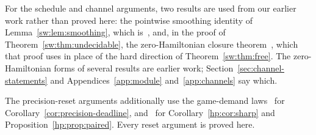 For the schedule and channel arguments, two results are used from our earlier work rather than proved here: the pointwise smoothing identity of Lemma~\ref{sw:lem:smoothing}, which is~\cite[Thm.~4.1 and Cor.~4.3]{Douglas26closed}, and, in the proof of Theorem~\ref{sw:thm:undecidable}, the zero-Hamiltonian closure theorem~\cite[Thm.~3.2(a)]{Memory}, which that proof uses in place of the hard direction of Theorem~\ref{sw:thm:free}. The zero-Hamiltonian forms of several results are earlier work; Section~\ref{sec:channel-statements} and Appendices~\ref{app:module} and~\ref{app:channels} say which.

The precision-reset arguments additionally use the game-demand laws~\cite[Theorem~1.1]{HPuncomputable} for Corollary~\ref{cor:precision-deadline}, and~\cite[Theorem~11.9 and Corollary~11.11]{HPprecision} for Corollary~\ref{hp:cor:sharp} and Proposition~\ref{hp:prop:paired}. Every reset argument is proved here.

